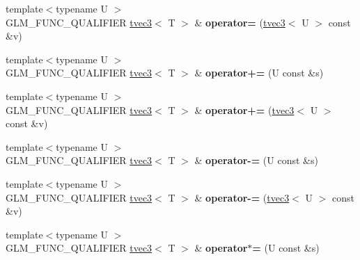 \begin{DoxyCompactItemize}
\item 
\hypertarget{structglm_1_1detail_1_1tvec3_afbea05dd3be1f47275bdec2706235c4d}{}{\footnotesize template$<$typename U $>$ }\\G\+L\+M\+\_\+\+F\+U\+N\+C\+\_\+\+Q\+U\+A\+L\+I\+F\+I\+E\+R \hyperlink{structglm_1_1detail_1_1tvec3}{tvec3}$<$ T $>$ \& {\bfseries operator=} (\hyperlink{structglm_1_1detail_1_1tvec3}{tvec3}$<$ U $>$ const \&v)\label{structglm_1_1detail_1_1tvec3_afbea05dd3be1f47275bdec2706235c4d}

\item 
\hypertarget{structglm_1_1detail_1_1tvec3_a0982080f3d38046a64b8507985b39d95}{}{\footnotesize template$<$typename U $>$ }\\G\+L\+M\+\_\+\+F\+U\+N\+C\+\_\+\+Q\+U\+A\+L\+I\+F\+I\+E\+R \hyperlink{structglm_1_1detail_1_1tvec3}{tvec3}$<$ T $>$ \& {\bfseries operator+=} (U const \&s)\label{structglm_1_1detail_1_1tvec3_a0982080f3d38046a64b8507985b39d95}

\item 
\hypertarget{structglm_1_1detail_1_1tvec3_adf799511f76438da0ef780ff042dc9c0}{}{\footnotesize template$<$typename U $>$ }\\G\+L\+M\+\_\+\+F\+U\+N\+C\+\_\+\+Q\+U\+A\+L\+I\+F\+I\+E\+R \hyperlink{structglm_1_1detail_1_1tvec3}{tvec3}$<$ T $>$ \& {\bfseries operator+=} (\hyperlink{structglm_1_1detail_1_1tvec3}{tvec3}$<$ U $>$ const \&v)\label{structglm_1_1detail_1_1tvec3_adf799511f76438da0ef780ff042dc9c0}

\item 
\hypertarget{structglm_1_1detail_1_1tvec3_a73be343ed604341374da5cae43f58721}{}{\footnotesize template$<$typename U $>$ }\\G\+L\+M\+\_\+\+F\+U\+N\+C\+\_\+\+Q\+U\+A\+L\+I\+F\+I\+E\+R \hyperlink{structglm_1_1detail_1_1tvec3}{tvec3}$<$ T $>$ \& {\bfseries operator-\/=} (U const \&s)\label{structglm_1_1detail_1_1tvec3_a73be343ed604341374da5cae43f58721}

\item 
\hypertarget{structglm_1_1detail_1_1tvec3_aa88a901763b81c379f9cd1ae0ddb14b7}{}{\footnotesize template$<$typename U $>$ }\\G\+L\+M\+\_\+\+F\+U\+N\+C\+\_\+\+Q\+U\+A\+L\+I\+F\+I\+E\+R \hyperlink{structglm_1_1detail_1_1tvec3}{tvec3}$<$ T $>$ \& {\bfseries operator-\/=} (\hyperlink{structglm_1_1detail_1_1tvec3}{tvec3}$<$ U $>$ const \&v)\label{structglm_1_1detail_1_1tvec3_aa88a901763b81c379f9cd1ae0ddb14b7}

\item 
\hypertarget{structglm_1_1detail_1_1tvec3_aa17a935b1c21418e60ddff7d55a96e01}{}{\footnotesize template$<$typename U $>$ }\\G\+L\+M\+\_\+\+F\+U\+N\+C\+\_\+\+Q\+U\+A\+L\+I\+F\+I\+E\+R \hyperlink{structglm_1_1detail_1_1tvec3}{tvec3}$<$ T $>$ \& {\bfseries operator$\ast$=} (U const \&s)\label{structglm_1_1detail_1_1tvec3_aa17a935b1c21418e60ddff7d55a96e01}


\end{DoxyCompactItemize}
